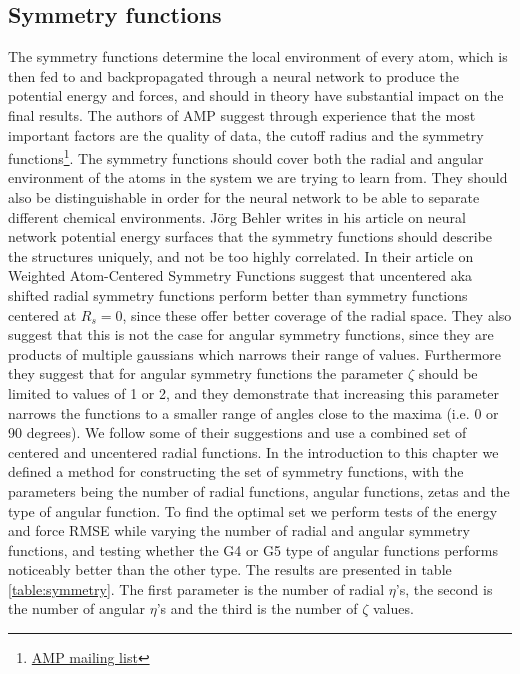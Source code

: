\subsection{Symmetry functions}
The symmetry functions determine the local environment of every atom,
which is then fed to and backpropagated through a neural network
to produce the potential energy and forces,
and should in theory have substantial impact on the final results.
The authors of AMP suggest through experience that the most important
factors are the quality of data, the cutoff radius and the symmetry functions\footnote{
    \href{https://listserv.brown.edu/cgi-bin/wa?A2=AMP-USERS;52062bd3.1810}{
        AMP mailing list}}.
The symmetry functions should cover both the radial and angular
environment of the atoms in the system we are trying to learn from.
They should also be distinguishable in order for the neural network
to be able to separate different chemical environments.
J{\"o}rg Behler writes in his article on neural network potential
energy surfaces \parencite[Behler]{behler2011neural}
that the symmetry functions should describe the structures uniquely,
and not be too highly correlated.
In their article on Weighted Atom-Centered Symmetry Functions
\parencite[Gastegger et al.]{gastegger2018wacsf} suggest that uncentered
aka shifted radial symmetry functions perform better than symmetry functions
centered at $R_s = 0$, since these offer better coverage of the radial space.
They also suggest that this is not the case for angular symmetry functions,
since they are products of multiple gaussians which narrows their range
of values. 
Furthermore they suggest that for angular symmetry functions
the parameter $\zeta$ should be limited to values of 1 or 2,
and they demonstrate that increasing this parameter narrows
the functions to a smaller range of angles close to the maxima
(i.e. 0 or 90 degrees).
We follow some of their suggestions and use a combined set of
centered and uncentered radial functions. 
In the introduction to this chapter we defined a method
for constructing the set of symmetry functions, with the parameters
being the number of radial functions, angular functions, zetas
and the type of angular function.
To find the optimal set
we perform tests of the energy and force RMSE while varying the
number of radial and angular symmetry functions, and testing
whether the G4 or G5 type of angular functions performs noticeably
better than the other type.
The results are presented in table \ref{table:symmetry}.
The first parameter is the number of radial $\eta$'s,
the second is the number of angular $\eta$'s and the third
is the number of $\zeta$ values.

